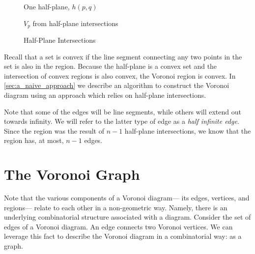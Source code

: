 \documentclass[12pt,twoside]{reedthesis}
\begin{document}
    \begin{figure}[!htb]
      \centering
      \begin{subtable}{.475\textwidth}
        
        \caption{One half-plane, $h(p, q)$}
        \label{fig:one_half_plane}
      \end{subtable}%
      \begin{subtable}{.475\textwidth}
      \centering
        
        \caption{$V_{p}$ from half-plane intersections}
        \label{fig:all_half_planes}
      \end{subtable}
      \caption{Half-Plane Intersections}
      \label{fig:half_planes}
    \end{figure}
    Recall that a set is convex if the line segment connecting any two points in the set is also in the region. Because the half-plane is a convex set and the intersection of convex regions is also convex, the Voronoi region is convex. In \cref{sec:a_naive_approach} we describe an algorithm to construct the Voronoi diagram using an approach which relies on half-plane intersections.\par


    Note that some of the edges will be line segments, while others will extend out towards infinity. We will refer to the latter type of edge as a \emph{half infinite edge}. Since the region was the result of $n-1$ half-plane intersections, we know that the region has, at most, $n-1$ edges. \par

  \section{The Voronoi Graph} %
  \label{sec:voronoi_graph}
    Note that the various components of a Voronoi diagram--- its edges, vertices, and regions--- relate to each other in a non-geometric way. Namely, there is an underlying combinatorial structure associated with a diagram. Consider the set of edges of a Voronoi diagram. An edge connects two Voronoi vertices. We can leverage this fact to describe the Voronoi diagram in a combinatorial way: as a graph.\par
\end{document}
